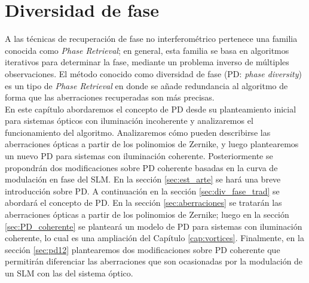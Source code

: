 \chapter{Diversidad de fase}
\label{cap:diversidad}

A las técnicas de recuperación de fase no interferométrico pertenece una familia conocida como \textit{Phase Retrieval}; en general, esta familia se basa en algoritmos iterativos para determinar la fase, mediante un problema inverso de múltiples observaciones. El método conocido como diversidad de fase (PD: \textit{phase diversity}) es un tipo de \textit{Phase Retrieval} en donde se añade redundancia al algoritmo de forma que las aberraciones recuperadas son más precisas.\\



En este capítulo abordaremos el concepto de PD desde su planteamiento inicial para sistemas ópticos con iluminación incoherente y analizaremos el funcionamiento del algoritmo. Analizaremos cómo pueden describirse las aberraciones ópticas a partir de los polinomios de Zernike, y luego plantearemos un nuevo PD para sistemas con iluminación coherente. Posteriormente se propondrán dos modificaciones sobre PD coherente basadas en la curva de modulación en fase del SLM. En la sección \ref{sec:est_arte} se hará una breve introducción sobre PD. A continuación en la sección \ref{sec:div_fase_trad} se abordará el concepto de PD. En la sección \ref{sec:aberraciones} se tratarán las aberraciones ópticas a partir de los polinomios de Zernike; luego en la sección \ref{sec:PD_coherente} se planteará un modelo de PD para sistemas con iluminación coherente, lo cual es una ampliación del Capítulo \ref{cap:vortices}. Finalmente, en la sección \ref{sec:pd12} plantearemos dos modificaciones sobre PD coherente que permitirán diferenciar las aberraciones que son ocasionadas por la modulación de un SLM con las del sistema óptico.

